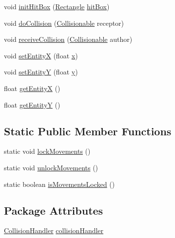 \begin{DoxyCompactItemize}
void \mbox{\hyperlink{classentities_1_1_mobile_entity_ae57193cf5e05bde18c9b1e2bf22a8eb8}{init\+Hit\+Box}} (\mbox{\hyperlink{classorg_1_1newdawn_1_1slick_1_1geom_1_1_rectangle}{Rectangle}} \mbox{\hyperlink{classentities_1_1_mobile_entity_a996d583dcbf4fd5609e14ec87dbfa7a6}{hit\+Box}})
\item 
void \mbox{\hyperlink{classentities_1_1_mobile_entity_af199b48458492a960d53a5a7c7685552}{do\+Collision}} (\mbox{\hyperlink{interfaceentities_1_1_collisionable}{Collisionable}} receptor)
\item 
void \mbox{\hyperlink{classentities_1_1_mobile_entity_a84c8b17b0285f2ed67edadb70e1db80b}{receive\+Collision}} (\mbox{\hyperlink{interfaceentities_1_1_collisionable}{Collisionable}} author)
\item 
void \mbox{\hyperlink{classentities_1_1_mobile_entity_a99e4a1603aabaaf21c91ffad2e0d86cf}{set\+EntityX}} (float \mbox{\hyperlink{classorg_1_1newdawn_1_1slick_1_1geom_1_1_shape_a3e985bfff386c15a4efaad03d8ad60d3}{x}})
\item 
void \mbox{\hyperlink{classentities_1_1_mobile_entity_a08206aa00cd7b2e7d5cfeb2b1b2338cb}{set\+EntityY}} (float \mbox{\hyperlink{classorg_1_1newdawn_1_1slick_1_1geom_1_1_shape_a9f934baded6a1b65ebb69e7e5f80ea00}{y}})
\item 
float \mbox{\hyperlink{classentities_1_1_mobile_entity_a49dea6e4e953167028704395a99138fb}{get\+EntityX}} ()
\item 
float \mbox{\hyperlink{classentities_1_1_mobile_entity_a8e231bee5ceaa0c240e9a8519e051d6b}{get\+EntityY}} ()
\end{DoxyCompactItemize}
\subsection*{Static Public Member Functions}
\begin{DoxyCompactItemize}
\item 
static void \mbox{\hyperlink{classentities_1_1_mobile_entity_a3284200b03980579fdae3aafd10c062b}{lock\+Movements}} ()
\item 
static void \mbox{\hyperlink{classentities_1_1_mobile_entity_afde0f7cfc65d03220cd208c6ae572e78}{unlock\+Movements}} ()
\item 
static boolean \mbox{\hyperlink{classentities_1_1_mobile_entity_a3f9a4fa9cdc8d46f112acdad90888bcd}{is\+Movements\+Locked}} ()
\end{DoxyCompactItemize}
\subsection*{Package Attributes}
\begin{DoxyCompactItemize}
\item 
\mbox{\hyperlink{classentities_1_1_collision_handler}{Collision\+Handler}} \mbox{\hyperlink{classentities_1_1_mobile_entity_a29fbe797671b1fc81eafe1e48fdc46f9}{collision\+Handler}}
\end{DoxyCompactItemize}

